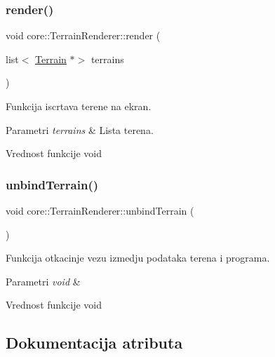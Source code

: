 \subsubsection{\texorpdfstring{render()}{render()}}
{\footnotesize\ttfamily void core\+::\+Terrain\+Renderer\+::render (\begin{DoxyParamCaption}\item[{list$<$ \hyperlink{classterrain_1_1Terrain}{Terrain} $\ast$$>$}]{terrains }\end{DoxyParamCaption})}



Funkcija iscrtava terene na ekran. 


\begin{DoxyParams}{Parametri}
{\em terrains} & Lista terena. \\
\hline
\end{DoxyParams}
\begin{DoxyReturn}{Vrednost funkcije}
void 
\end{DoxyReturn}
\mbox{\label{classcore_1_1TerrainRenderer_ac739a96169a8fef7bfad56bbe3367962}} 
\subsubsection{\texorpdfstring{unbind\+Terrain()}{unbindTerrain()}}
{\footnotesize\ttfamily void core\+::\+Terrain\+Renderer\+::unbind\+Terrain (\begin{DoxyParamCaption}{ }\end{DoxyParamCaption})}



Funkcija otkacinje vezu izmedju podataka terena i programa. 


\begin{DoxyParams}{Parametri}
{\em void} & \\
\hline
\end{DoxyParams}
\begin{DoxyReturn}{Vrednost funkcije}
void 
\end{DoxyReturn}


\subsection{Dokumentacija atributa}
\mbox{\label{classcore_1_1TerrainRenderer_abc56752e01a0b9b0ebfd57b8daa6172c}} 
